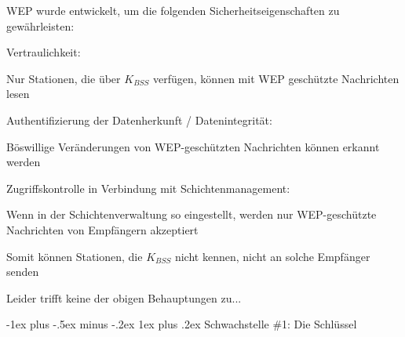 \documentclass[a4paper]{article}
\makeatletter
\renewcommand{\subsubsection}{\@startsection{subsubsection}{3}{0mm}%
 {-1ex plus -.5ex minus -.2ex}%
 {1ex plus .2ex}%
 {\normalfont\small\bfseries}}
\makeatother
\begin{document}
\begin{multicols}{3}
      \begin{itemize*}
            \item WEP wurde entwickelt, um die folgenden Sicherheitseigenschaften zu
            gewährleisten:
            \begin{itemize*}
                  \item Vertraulichkeit:
                  \begin{itemize*} \item Nur Stationen, die über $K_{BSS}$ verfügen, können mit WEP geschützte Nachrichten lesen \end{itemize*}
                  \item Authentifizierung der Datenherkunft / Datenintegrität:
                  \begin{itemize*} \item Böswillige Veränderungen von WEP-geschützten Nachrichten können erkannt werden \end{itemize*}
                  \item Zugriffskontrolle in Verbindung mit Schichtenmanagement:
                  \begin{itemize*} \item Wenn in der Schichtenverwaltung so eingestellt, werden nur WEP-geschützte Nachrichten von Empfängern akzeptiert \item Somit können Stationen, die $K_{BSS}$ nicht kennen, nicht an solche Empfänger senden \end{itemize*}
            \end{itemize*}
            \item Leider trifft keine der obigen Behauptungen zu...
      \end{itemize*}


      \subsubsection{Schwachstelle \#1: Die
            Schlüssel}


\end{multicols}
\end{document}
